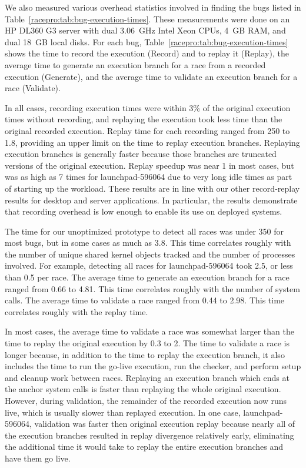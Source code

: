 We also measured various overhead statistics involved in finding the
bugs listed in Table~\ref{racepro:tab:bug-execution-times}.  These measurements were done
on an HP DL360 G3 server with dual 3.06~GHz Intel Xeon CPUs, 4~GB RAM,
and dual 18~GB local disks.  For
each bug, Table~\ref{racepro:tab:bug-execution-times} shows the time to record the
execution (Record) and to 
replay it (Replay), the average time to generate an execution branch
for a race from a recorded execution (Generate), and the average time
to validate an execution branch for a race (Validate).

In all cases, recording execution times were within 3\% of the original
execution times without recording, and replaying the execution
took less time than the original recorded execution.  Replay time for
each recording ranged from 250\ms{} to 1.8\secs{}, providing an upper
limit on the time to replay execution branches.  Replaying execution
branches is generally faster because those branches are truncated
versions of the original execution.  Replay speedup was near 1 in most
cases, but was as high as 7 times for launchpad-596064 due to very
long idle times as part of starting up the workload.
These results are in line with our other record-replay results for
desktop and server applications.  In particular, the results
demonstrate that \racepro recording overhead is low enough to enable its
use on deployed systems. 

The time for our unoptimized prototype to detect all races was under
350\ms{} for most bugs, but in some cases as much as 3.8\secs{}.  
This time correlates roughly with the number of unique shared kernel
objects tracked and the number of processes involved.  
For example, detecting all races for launchpad-596064 took 2.5\secs{},
or less than 0.5\ms{} per race.
The average time to generate an execution branch for a race ranged from
0.66\secs{} to 4.81\secs{}.  This time correlates roughly with the
number of system calls.  The average time to validate a race ranged
from 0.44\secs{} to 2.98\secs{}.  This time correlates roughly with
the replay time.  

In most cases, the average time to validate a race was somewhat larger
than the time to replay the original execution by 0.3\secs{} to
2\secs{}. The time to validate a race is longer because, in addition to
the time to replay the execution branch, it also includes the time to
run the go-live execution, run the checker, and perform setup and
cleanup work between races. Replaying an execution branch which ends
at the anchor system calls is faster than replaying the whole original
execution.  However, during validation, the remainder of the recorded
execution now runs live, which is usually slower than replayed
execution. In one case, launchpad-596064, validation was faster then
original execution replay because nearly all of the execution branches
resulted in replay divergence relatively early, eliminating the
additional time it would take to replay the entire execution branches
and have them go live.

